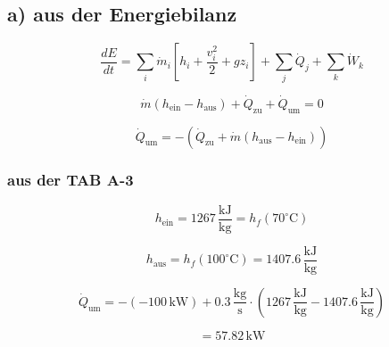 \subsection*{a) aus der Energiebilanz}

\[
\frac{dE}{dt} = \sum_i \dot{m}_i \left[ h_i + \frac{v_i^2}{2} + g z_i \right] + \sum_j \dot{Q}_j + \sum_k \dot{W}_k
\]

\[
\dot{m} (h_{\text{ein}} - h_{\text{aus}}) + \dot{Q}_{\text{zu}} + \dot{Q}_{\text{um}} = 0
\]

\[
\dot{Q}_{\text{um}} = -(\dot{Q}_{\text{zu}} + \dot{m} (h_{\text{aus}} - h_{\text{ein}}))
\]

\subsubsection*{aus der TAB A-3}

\[
h_{\text{ein}} = 1267 \, \frac{\text{kJ}}{\text{kg}} = h_f (70^\circ \text{C})
\]

\[
h_{\text{aus}} = h_f (100^\circ \text{C}) = 1407.6 \, \frac{\text{kJ}}{\text{kg}}
\]

\[
\dot{Q}_{\text{um}} = -(-100 \, \text{kW}) + 0.3 \, \frac{\text{kg}}{\text{s}} \cdot (1267 \, \frac{\text{kJ}}{\text{kg}} - 1407.6 \, \frac{\text{kJ}}{\text{kg}})
\]

\[
= 57.82 \, \text{kW}
\]